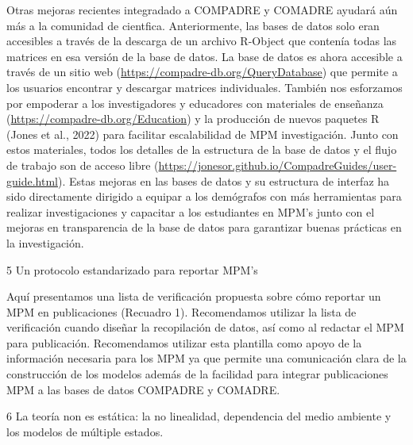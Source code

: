 \documentclass[
  12pt,
  letterpaper,
]{book}
\begin{document}
Otras mejoras recientes integradado a COMPADRE y COMADRE ayudará aún más
a la comunidad de cientfica. Anteriormente, las bases de datos solo eran
accesibles a través de la descarga de un archivo R-Object que contenía
todas las matrices en esa versión de la base de datos. La base de datos
es ahora accesible a través de un sitio web
(\url{https://compadre-db.org/QueryDatabase}) que permite a los usuarios
encontrar y descargar matrices individuales. También nos esforzamos por
empoderar a los investigadores y educadores con materiales de enseñanza
(\url{https://compadre-db.org/Education}) y la producción de nuevos
paquetes R (Jones et al., 2022) para facilitar escalabilidad de MPM
investigación. Junto con estos materiales, todos los detalles de la
estructura de la base de datos y el flujo de trabajo son de acceso libre
(\url{https://jonesor.github.io/CompadreGuides/user-guide.html}). Estas
mejoras en las bases de datos y su estructura de interfaz ha sido
directamente dirigido a equipar a los demógrafos con más herramientas
para realizar investigaciones y capacitar a los estudiantes en MPM's
junto con el mejoras en transparencia de la base de datos para
garantizar buenas prácticas en la investigación.

5 \textbar{} Un protocolo estandarizado para reportar MPM's

Aquí presentamos una lista de verificación propuesta sobre cómo reportar
un MPM en publicaciones (Recuadro 1). Recomendamos utilizar la lista de
verificación cuando diseñar la recopilación de datos, así como al
redactar el MPM para publicación. Recomendamos utilizar esta plantilla
como apoyo de la información necesaria para los MPM ya que permite una
comunicación clara de la construcción de los modelos además de la
facilidad para integrar publicaciones MPM a las bases de datos COMPADRE
y COMADRE.

6 \textbar{} La teoría non es estática: la no linealidad, dependencia
del medio ambiente y los modelos de múltiple estados.
\end{document}
